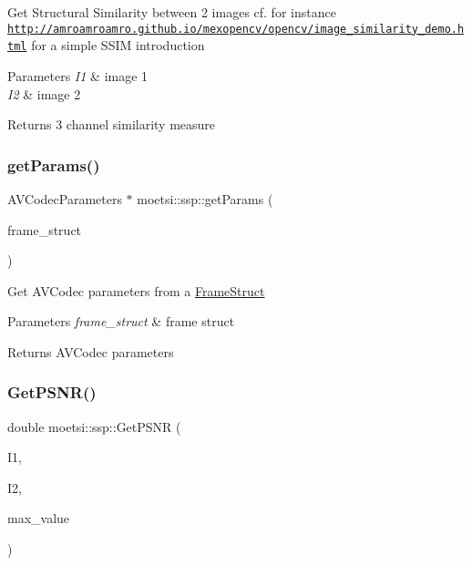 Get Structural Similarity between 2 images cf. for instance \href{http://amroamroamro.github.io/mexopencv/opencv/image_similarity_demo.html}{\tt http\+://amroamroamro.\+github.\+io/mexopencv/opencv/image\+\_\+similarity\+\_\+demo.\+html} for a simple S\+S\+IM introduction 
\begin{DoxyParams}{Parameters}
{\em I1} & image 1 \\
\hline
{\em I2} & image 2 \\
\hline
\end{DoxyParams}
\begin{DoxyReturn}{Returns}
3 channel similarity measure 
\end{DoxyReturn}
\mbox{\label{namespacemoetsi_1_1ssp_a2d7925d2be7b96068b314ec08c673df6}} 
\subsubsection{\texorpdfstring{get\+Params()}{getParams()}}
{\footnotesize\ttfamily A\+V\+Codec\+Parameters $\ast$ moetsi\+::ssp\+::get\+Params (\begin{DoxyParamCaption}\item[{\hyperlink{structmoetsi_1_1ssp_1_1FrameStruct}{Frame\+Struct} \&}]{frame\+\_\+struct }\end{DoxyParamCaption})}

Get A\+V\+Codec parameters from a \hyperlink{structmoetsi_1_1ssp_1_1FrameStruct}{Frame\+Struct} 
\begin{DoxyParams}{Parameters}
{\em frame\+\_\+struct} & frame struct \\
\hline
\end{DoxyParams}
\begin{DoxyReturn}{Returns}
A\+V\+Codec parameters 
\end{DoxyReturn}
\mbox{\label{namespacemoetsi_1_1ssp_a0290f5110cb2cd2c9327c2fa6a528c84}} 
\subsubsection{\texorpdfstring{Get\+P\+S\+N\+R()}{GetPSNR()}}
{\footnotesize\ttfamily double moetsi\+::ssp\+::\+Get\+P\+S\+NR (\begin{DoxyParamCaption}\item[{const Mat \&}]{I1,  }\item[{const Mat \&}]{I2,  }\item[{double}]{max\+\_\+value }\end{DoxyParamCaption})}

